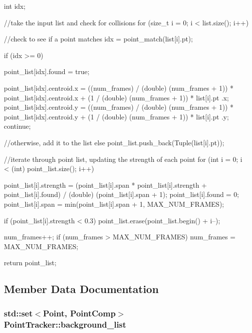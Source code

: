 \begin{DoxyCode}
                                                                     {

    int idx;

    //take the input list and check for collisions
    for (size_t i = 0; i < list.size(); i++) {

        //check to see if a point matches
        idx = point_match(list[i].pt);

        if (idx >= 0) {
            point_list[idx].found = true;

            point_list[idx].centroid.x = ((num_frames) / (double) (num_frames +
       1)) * point_list[idx].centroid.x + (1 / (double) (num_frames + 1)) * list[i].pt
      .x;
            point_list[idx].centroid.y = ((num_frames) / (double) (num_frames +
       1)) * point_list[idx].centroid.y + (1 / (double) (num_frames + 1)) * list[i].pt
      .y;
            continue;
        }//otherwise, add it to the list
        else {
            point_list.push_back(Tuple(list[i].pt));
        }
    }

    //iterate through point list, updating the strength of each point
    for (int i = 0; i < (int) point_list.size(); i++) {
        point_list[i].strength = (point_list[i].span * point_list[i].strength +
       point_list[i].found) / (double) (point_list[i].span + 1);
        point_list[i].found = 0;
        point_list[i].span = min(point_list[i].span + 1, MAX_NUM_FRAMES);


        if (point_list[i].strength < 0.3)
            point_list.erase(point_list.begin() + i--);
    }

    num_frames++;
    if (num_frames > MAX_NUM_FRAMES)
        num_frames = MAX_NUM_FRAMES;

    return point_list;
}
\end{DoxyCode}


\subsection{\-Member \-Data \-Documentation}
\hypertarget{class_point_tracker_a8004ae283ecebae76ba65cd13106651d}{
\subsubsection[{background\-\_\-list}]{\setlength{\rightskip}{0pt plus 5cm}std\-::set$<$\-Point, {\bf \-Point\-Comp}$>$ {\bf \-Point\-Tracker\-::background\-\_\-list}}}
\label{class_point_tracker_a8004ae283ecebae76ba65cd13106651d}


